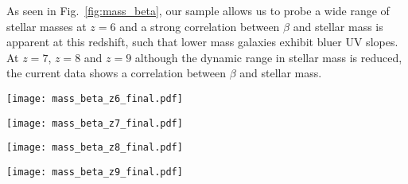 \documentclass[twocolumn]{aastex63}
\begin{document}
As seen in Fig.~\ref{fig:mass_beta}, our sample allows us to probe a wide range of stellar masses at $z=6$ and a strong correlation between $\beta$ and stellar mass is apparent at this redshift, such that lower mass galaxies exhibit bluer UV slopes. At $z=7$, $z=8$ and $z=9$ although the dynamic range in stellar mass is reduced, the current data shows a correlation between $\beta$ and stellar mass. 

\begin{figure*}
\centering
\begin{minipage}{0.45\textwidth}
\centering
\texttt{[image: mass\_beta\_z6\_final.pdf]}
\end{minipage}
\begin{minipage}{0.45\textwidth}
\centering
\texttt{[image: mass\_beta\_z7\_final.pdf]}
\end{minipage}
\begin{minipage}{0.45\textwidth}
\centering
\texttt{[image: mass\_beta\_z8\_final.pdf]}
\end{minipage}
\begin{minipage}{0.45\textwidth}
\centering
\texttt{[image: mass\_beta\_z9\_final.pdf]}
\end{minipage}
\caption{Estimated UV slope $\beta$ vs stellar mass at $z=6-9$. The filled yellow circles show the results for individual galaxies, whereas the black circles show the median value of $\beta$ in each stellar mass bin of $1M_{\odot}$, with the uncertainties being the errors on the median, estimated with bootstrap Monte Carlo simulations. The solid red lines shows a linear fit through the median $\beta$ points. There is a strong correlation between $\beta$ and stellar mass in all redshift bins, such that lower mass galaxies exhibit bluer UV slopes. The best-fit lines of \citet{Finkelstein2012} are also shown by dashed magenta lines for comparison. The red curve denotes the 20 per cent completeness level estimated from our simulations, whereas the purple curve is the 20 per cent completeness level from \citet{Finkelstein2012} shown for comparison.}
\label{fig:mass_beta}
\end{figure*}
\end{document}
